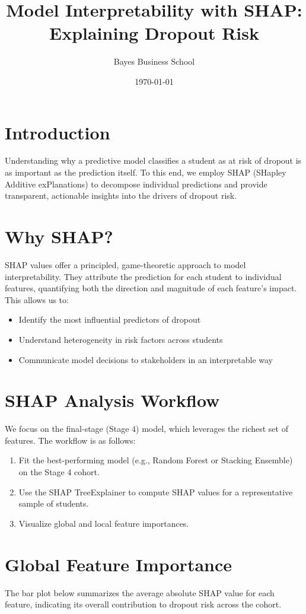 \documentclass[12pt]{article}
\title{Model Interpretability with SHAP: Explaining Dropout Risk}
\author{Bayes Business School}
\date{\today}
\begin{document}
\maketitle

\section{Introduction}
Understanding why a predictive model classifies a student as at risk of dropout is as important as the prediction itself. To this end, we employ SHAP (SHapley Additive exPlanations) to decompose individual predictions and provide transparent, actionable insights into the drivers of dropout risk.

\section{Why SHAP?}
SHAP values offer a principled, game-theoretic approach to model interpretability. They attribute the prediction for each student to individual features, quantifying both the direction and magnitude of each feature's impact. This allows us to:
\begin{itemize}
    \item Identify the most influential predictors of dropout
    \item Understand heterogeneity in risk factors across students
    \item Communicate model decisions to stakeholders in an interpretable way
\end{itemize}

\section{SHAP Analysis Workflow}
We focus on the final-stage (Stage 4) model, which leverages the richest set of features. The workflow is as follows:
\begin{enumerate}
    \item Fit the best-performing model (e.g., Random Forest or Stacking Ensemble) on the Stage 4 cohort.
    \item Use the SHAP TreeExplainer to compute SHAP values for a representative sample of students.
    \item Visualize global and local feature importances.
\end{enumerate}

\section{Global Feature Importance}
The bar plot below summarizes the average absolute SHAP value for each feature, indicating its overall contribution to dropout risk across the cohort.
\end{document}
